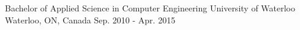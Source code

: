 

\begin{cventries}

  \cventry
    {Bachelor of Applied Science in Computer Engineering} %
    {University of Waterloo} %
    {Waterloo, ON, Canada} %
    {Sep. 2010 - Apr. 2015} %
    {
    }

\end{cventries}
